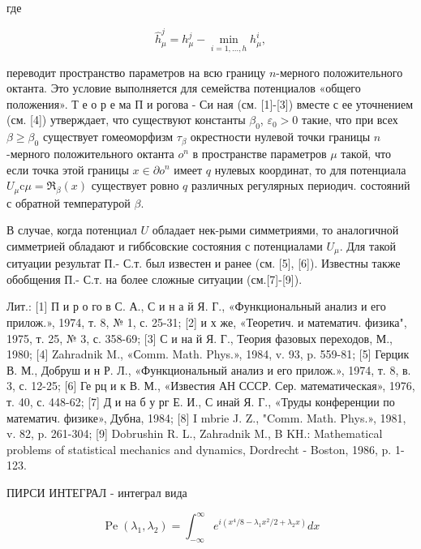 \documentclass[10pt]{article}
\begin{document}
где



\[

\hat{h}_{\mu}^{j}=h_{\mu}^{j}-\min _{i=1, \ldots, h} h_{\mu}^{i},

\]



переводит пространство параметров на всю границу $n$-мерного положительного октанта. Это условие выполняется для семейства потенциалов «общего положения». Т е о р е ма П и рогова - Си ная (см. [1]-[3]) вместе с ее уточнением (см. [4]) утверждает, что существуют константы $\beta_{0}$, $\varepsilon_{0}>0$ такие, что при всех $\beta \geqslant \beta_{0}$ существует гомеоморфизм $\tau_{\beta}$ окрестности нулевой точки границы $n$-мерного положительного октанта $o^{n}$ в пространстве параметров $\mu$ такой, что если точка этой границы $x \in \partial o^{n}$ имеет $q$ нулевых координат, то для потенциала $U_{\mu} \mathrm{c} \mu=\Re_{\beta}(x)$ существует ровно $q$ различных регулярных периодич. состояний с обратной температурой $\beta$.



В случае, когда потенциал $U$ обладает нек-рыми симметриями, то аналогичной симметрией обладают и гиббсовские состояния с потенциалами $U_{\mu}$. Для такой ситуации результат П.- С.т. был известен и ранее (см. [5], [6]). Известны также обобщения П.- С.т. на более сложные ситуации (см.[7]-[9]).



Лит.: [1] П и р о го в С. А., С и н а й Я. Г., «Функциональный анализ и его прилож.», 1974, т. 8, № 1, с. 25-31; [2] и х же, «Теоретич. и математич. физика", 1975, т. 25, № 3, с. 358-69; [3] С и на й Я. Г., Теория фазовых переходов, М., 1980; [4] Zahradnik M., «Сomm. Math. Phys.», 1984, v. 93, p. 559-81; [5] Герцик В. М., Добруш и н Р. Л., «Функциональный анализ и его прилож.», 1974, т. 8, в. 3, с. 12-25; [6] Ге рц и к В. М., «Известия АН СССР. Сер. математическая», 1976, т. 40, с. 448-62; [7] Д и на б у рг Е. И., С инай Я. Г., «Труды конференции по математич. физике», Дубна, 1984; [8] I mbrie J. Z., "Comm. Math. Phys.», 1981, v. 82, p. 261-304; [9] Dobrushin R. L., Zahradnik M., B KH.: Mathematical problems of statistical mechanics and dynamics, Dordrecht - Boston, 1986, p. 1-123.



ПИРСИ ИНТЕГРАЛ - интеграл вида



\[

\operatorname{Pe}\left(\lambda_{1}, \lambda_{2}\right)=\int_{-\infty}^{\infty} e^{i\left(x^{4} / 8-\lambda_{1} x^{2} / 2+\lambda_{2} x\right)} d x

\]
\end{document}
